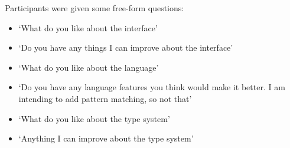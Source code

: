 
    


Participants were given some free-form questions:
\begin{itemize}
    \item `What do you like about the interface'
    \item `Do you have any things I can improve about the interface'
    \item `What do you like about the language'
    \item `Do you have any language features you think would make it better. I am intending to add pattern matching, so not that'
    \item `What do you like about the type system'
    \item `Anything I can improve about the type system'
\end{itemize}

